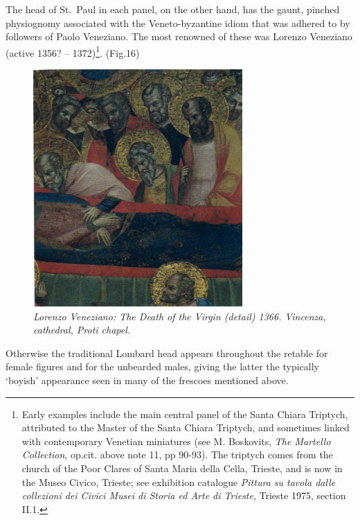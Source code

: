 \documentclass[a4paper,12pt]{article}
\begin{document}
The head of St.~Paul
in each panel, on the other hand, has the gaunt, pinched physiognomy
associated with the Veneto-byzantine idiom that was adhered to by
followers of Paolo Veneziano. The most renowned of these was Lorenzo
Veneziano (active 1356? -- 1372)\footnote{Early examples include the
main central panel of the Santa Chiara Triptych, attributed to the
Master of the Santa Chiara Triptych, and sometimes linked with
contemporary Venetian miniatures (see M. Boskovits, \textit{The
Martello Collection}, op.cit. above note 11, pp 90-93). The triptych
comes from the church of the Poor Clares of Santa Maria della Cella,
Trieste, and is now in the Museo Civico, Trieste; see exhibition
catalogue \textit{Pittura su tavola dalle collezioni dei Civici Musei
di Storia ed Arte di Trieste}, Trieste 1975, section II.1.}. (Fig.16)
\begin{figure}[htbp]
\centering
\includegraphics[width=8cm]{pics/fig16.png}
\caption[Lorenzo Veneziano: The Death of the Virgin (detail)
  1366]
{\it Lorenzo Veneziano: The Death of the Virgin (detail)
  1366. Vincenza, cathedral, Proti chapel.}  
\end{figure}
Otherwise the traditional Lombard head appears throughout the retable
for female figures and for the unbearded males, giving the latter the
typically `boyish' appearance seen in many of the frescoes mentioned
above.
\end{document}
